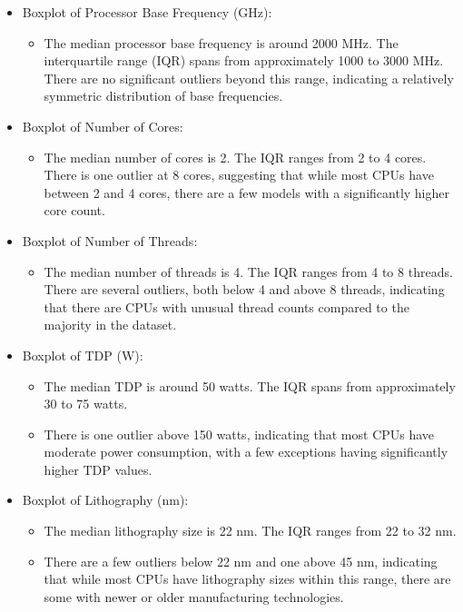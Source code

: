 \begin{itemize}
    \item Boxplot of Processor Base Frequency (GHz):
    \begin{itemize}
        \item The median processor base frequency is around 2000 MHz. The interquartile range (IQR) spans from approximately 1000 to 3000 MHz. There are no significant outliers beyond this range, indicating a relatively symmetric distribution of base frequencies.
    \end{itemize}

    \item Boxplot of Number of Cores:
    \begin{itemize}
        \item The median number of cores is 2. The IQR ranges from 2 to 4 cores. There is one outlier at 8 cores, suggesting that while most CPUs have between 2 and 4 cores, there are a few models with a significantly higher core count.
    \end{itemize}

    \item Boxplot of Number of Threads:
    \begin{itemize}
        \item The median number of threads is 4. The IQR ranges from 4 to 8 threads. There are several outliers, both below 4 and above 8 threads, indicating that there are CPUs with unusual thread counts compared to the majority in the dataset.
    \end{itemize}
    
    \item Boxplot of TDP (W):
    \begin{itemize}
        \item The median TDP is around 50 watts. The IQR spans from approximately 30 to 75 watts. 
        \item There is one outlier above 150 watts, indicating that most CPUs have moderate power consumption, with a few exceptions having significantly higher TDP values.
    \end{itemize}

    \item Boxplot of Lithography (nm):
    \begin{itemize}
        \item The median lithography size is 22 nm. The IQR ranges from 22 to 32 nm. 
        \item There are a few outliers below 22 nm and one above 45 nm, indicating that while most CPUs have lithography sizes within this range, there are some with newer or older manufacturing technologies.
    \end{itemize}
\end{itemize}

